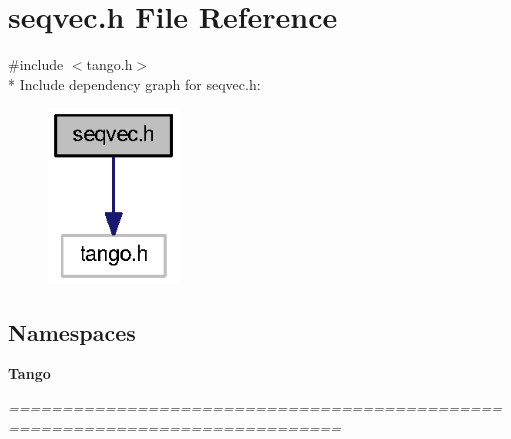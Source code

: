\section{seqvec.\-h File Reference}
\label{seqvec_8h}
{\ttfamily \#include $<$tango.\-h$>$}\\*
Include dependency graph for seqvec.\-h\-:
\nopagebreak
\begin{figure}[H]
\begin{center}
\leavevmode
\includegraphics[width=98pt]{dd/d37/seqvec_8h__incl}
\end{center}
\end{figure}
\subsection*{Namespaces}
\begin{DoxyCompactItemize}
\item 
{\bf Tango}
\begin{DoxyCompactList}\small\item\em ============================================================================= \end{DoxyCompactList}\end{DoxyCompactItemize}
